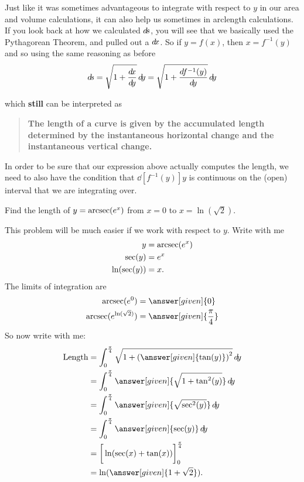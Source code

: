 \documentclass{ximera}
\begin{document}
Just like it was sometimes advantageous to integrate with respect to
$y$ in our area and volume calculations, it can also help us sometimes
in arclength calculations.  If you look back at how we calculated $\mathop{}\!d\!
s$, you will see that we basically used the Pythagorean Theorem, and
pulled out a $\mathop{}\!d\! x$.  So if $y = f(x)$, then $x = f^{-1}(y)$ and so
using the same reasoning as before
\[
\d s = \sqrt{1+\frac{\d x}{\d y}} \d y  = \sqrt{1+\dd[f^{-1}(y)]{y}} \d y
\]
\begin{image}
\end{image}
which \textbf{still} can be interpreted as
\begin{quote}
  \textbf{The length of a curve is given by the
    \textcolor{green!70!black!70!blue}{accumulated}
    \textcolor{purple!50!blue!90!black}{length determined by the
      instantaneous horizontal change and the instantaneous vertical
      change}.}
\end{quote}

\begin{warning}
  In order to be sure that our expression above actually computes the
  length, we need to also have the condition that $\dd[f^{-1}(y)]{y}$ is
  continuous on the (open) interval that we are integrating over.
\end{warning}

\begin{example}
  Find the length of $y = \operatorname{arcsec}(e^x)$ from $x= 0$ to
  $x=\ln(\sqrt{2})$.
  \begin{explanation}
    This problem will be much easier if we work with respect to $y$. Write with me
    \begin{align*}
      y &= \operatorname{arcsec}(e^x)\\
      \sec(y) &= e^x\\
      \ln(\sec(y)) &= x.
    \end{align*}
    The limits of integration are
    \begin{align*}
      \arcsec(e^0) &= \answer[given]{0}\\
      \arcsec(e^{\ln(\sqrt{2})}) &= \answer[given]{\frac{\pi}{4}}
    \end{align*}
    So now write with me:
    \begin{align*}
      \text{Length} &= \int_0^{\frac{\pi}{4}} \sqrt{1+\left( \answer[given]{\tan(y)} \right)^2} \d y\\
      &=\int_0^{\frac{\pi}{4}} \answer[given]{\sqrt{1+\tan^2(y)}}\d y\\
      &=\int_0^{\frac{\pi}{4}} \answer[given]{\sqrt{\sec^2(y)}}\d y\\
      &=\int_0^{\frac{\pi}{4}} \answer[given]{\sec(y)} \d y\\
      &=\eval{\ln(\sec(x)+\tan(x))}_0^\frac{\pi}{4}\\
      &=\ln(\answer[given]{1+\sqrt{2}}).
    \end{align*}
  \end{explanation}
\end{example}
\end{document}
